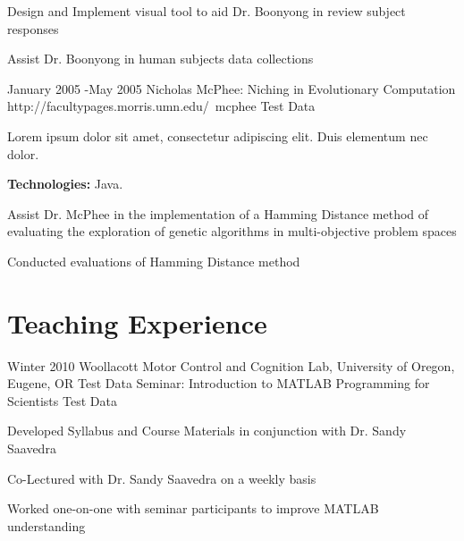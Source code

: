 \documentclass[10pt]{article} %
\begin{document}
\begin{itemize-noindent}
\item{Design and Implement visual tool to aid Dr. Boonyong in review subject responses}
\item{Assist Dr. Boonyong in human subjects data collections}
\end{itemize-noindent}


\job
{January 2005 -}{May 2005}
{Nicholas McPhee: Niching in Evolutionary Computation}
{http://facultypages.morris.umn.edu/~mcphee}
{Test Data}
{Lorem ipsum dolor sit amet, consectetur adipiscing elit. Duis elementum nec dolor. \\
\rule{0mm}{5mm}\textbf{Technologies:} Java.}

\begin{itemize-noindent}
\item{Assist Dr. McPhee in the implementation of a Hamming Distance method of evaluating the exploration of genetic algorithms in multi-objective problem spaces}
\item{Conducted evaluations of Hamming Distance method}
\end{itemize-noindent}


\section{Teaching Experience}

\job
{Winter 2010}{}
{Woollacott Motor Control and Cognition Lab, University of Oregon, Eugene, OR}
{Test Data}
{Seminar: Introduction to MATLAB Programming for Scientists}
{Test Data}

\begin{itemize-noindent}
\item{Developed Syllabus and Course Materials in conjunction with Dr. Sandy Saavedra}
\item{Co-Lectured with Dr. Sandy Saavedra on a weekly basis}
\item{Worked one-on-one with seminar participants to improve MATLAB understanding}
\end{itemize-noindent}

\end{document}
